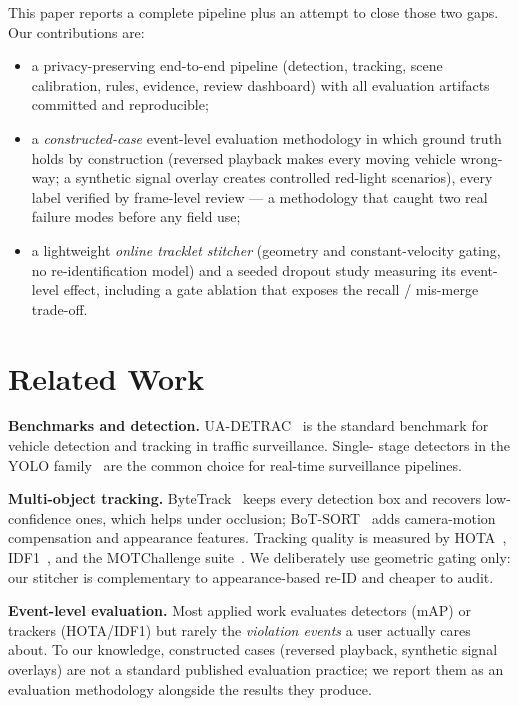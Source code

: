 \documentclass[conference]{IEEEtran}
\begin{document}
This paper reports a complete pipeline plus an attempt to close those two
gaps. Our contributions are:
\begin{itemize}
  \item a privacy-preserving end-to-end pipeline (detection, tracking,
  scene calibration, rules, evidence, review dashboard) with all evaluation
  artifacts committed and reproducible;
  \item a \emph{constructed-case} event-level evaluation methodology in which
  ground truth holds by construction (reversed playback makes every moving
  vehicle wrong-way; a synthetic signal overlay creates controlled red-light
  scenarios), every label verified by frame-level review --- a methodology
  that caught two real failure modes before any field use;
  \item a lightweight \emph{online tracklet stitcher} (geometry and
  constant-velocity gating, no re-identification model) and a seeded dropout
  study measuring its event-level effect, including a gate ablation that
  exposes the recall / mis-merge trade-off.
\end{itemize}

\section{Related Work}
\textbf{Benchmarks and detection.} UA-DETRAC~\cite{wen2020ua} is the standard
benchmark for vehicle detection and tracking in traffic surveillance. Single-
stage detectors in the YOLO family~\cite{jocher2023yolov8} are the common
choice for real-time surveillance pipelines.

\textbf{Multi-object tracking.} ByteTrack~\cite{zhang2022bytetrack} keeps
every detection box and recovers low-confidence ones, which helps under
occlusion; BoT-SORT~\cite{aharon2022botsort} adds camera-motion compensation
and appearance features. Tracking quality is measured by HOTA~\cite{luiten2021hota},
IDF1~\cite{ristani2016idf1}, and the MOTChallenge suite~\cite{milan2016mot16}.
We deliberately use geometric gating only: our stitcher is complementary to
appearance-based re-ID and cheaper to audit.

\textbf{Event-level evaluation.} Most applied work evaluates detectors (mAP)
or trackers (HOTA/IDF1) but rarely the \emph{violation events} a user actually
cares about. To our knowledge, constructed cases (reversed playback, synthetic
signal overlays) are not a standard published evaluation practice; we report
them as an evaluation methodology alongside the results they produce.
\end{document}
